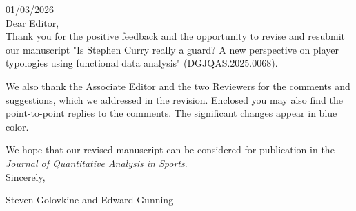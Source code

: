 \documentclass{article}
\date{\today}
\begin{document}
01/03/2026
\\

Dear Editor,
\\

Thank you for the positive feedback and the opportunity to revise and resubmit our manuscript "Is Stephen Curry really a guard? A new perspective on player typologies using functional data analysis" (DGJQAS.2025.0068).

We also thank the Associate Editor and the two Reviewers for the comments and suggestions, which we addressed in the revision. Enclosed you may also find the point-to-point replies to the comments. The significant changes appear in blue color. 

We hope that our revised manuscript can be considered for publication in the \emph{Journal of Quantitative Analysis in Sports}.
\\

Sincerely,

Steven Golovkine and Edward Gunning
\end{document}
